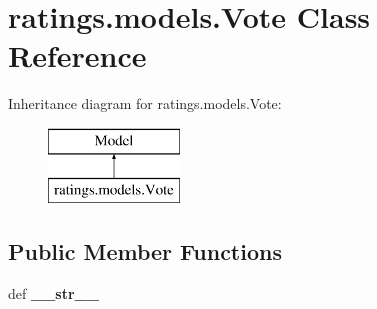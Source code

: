 \hypertarget{classratings_1_1models_1_1Vote}{\section{ratings.\-models.\-Vote Class Reference}
\label{classratings_1_1models_1_1Vote}
}
Inheritance diagram for ratings.\-models.\-Vote\-:\begin{figure}[H]
\begin{center}
\leavevmode
\includegraphics[height=2.000000cm]{classratings_1_1models_1_1Vote}
\end{center}
\end{figure}
\subsection*{Public Member Functions}
\begin{DoxyCompactItemize}
\item 
\hypertarget{classratings_1_1models_1_1Vote_a04c02c7dbcb684592cead310fb9c52fc}{def {\bfseries \-\_\-\-\_\-str\-\_\-\-\_\-}}\label{classratings_1_1models_1_1Vote_a04c02c7dbcb684592cead310fb9c52fc}

\end{DoxyCompactItemize}

